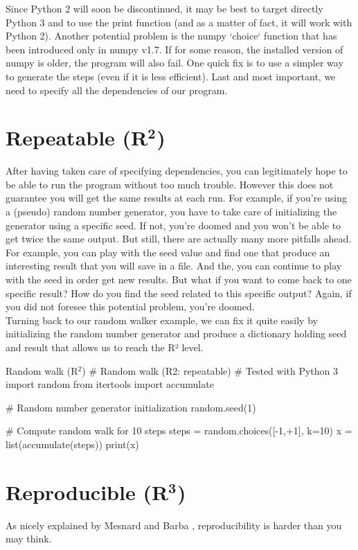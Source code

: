 \documentclass[a4paper,11pt]{article}
\begin{document}
Since Python 2 will soon be discontinued, it may be best to target directly Python 3 and to use the print function (and as a matter of fact, it will work with Python 2).
Another potential problem is the numpy `choice` function that has been introduced only in numpy v1.7.
If for some reason, the installed version of numpy is older, the program will also fail.
One quick fix is to use a simpler way to generate the steps (even if it is less efficient).
Last and most important, we need to specify all the dependencies of our program.


\clearpage
\section*{Repeatable (R$^{\mathbf 2}$)}

After having taken care of specifying dependencies, you can legitimately hope to be able to run the program without too much trouble.
However this does not guarantee you will get the same results at each run.
For example, if you're using a (pseudo) random number generator, you have to take care of initializing the generator using a specific seed.
If not, you're doomed and you won't be able to get twice the same output. But still, there are actually many more pitfalls ahead.
For example, you can play with the seed value and find one that produce an interesting result that you will save in a file.
And the, you can continue to play with the seed in order get new results.
But what if you want to come back to one specific result?
How do you find the seed related to this specific output?
Again, if you did not foresee this potential problem, you're doomed.\\

Turning back to our random walker example, we can fix it quite easily by initializing the random number generator and produce a dictionary holding seed and result that allows us to reach the R² level.

\begin{code}{Random walk (R$^2$)}
# Random walk (R2: repeatable)
# Tested with Python 3
import random
from itertools import accumulate

# Random number generator initialization
random.seed(1)

# Compute random walk for 10 steps
steps = random.choices([-1,+1], k=10)
x = list(accumulate(steps))
print(x) 
\end{code}


\clearpage
\section*{Reproducible (R$^{\mathbf 3}$)}
As nicely explained by Mesnard and Barba \cite{Mesnard:2016}, reproducibility is harder than you may think.
\end{document}
